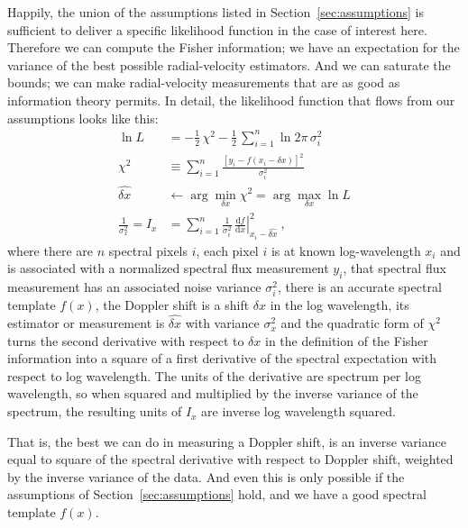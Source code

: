 \documentclass[modern]{aastex631}
\newcommand{\dd}{\mathrm{d}}
\newcommand{\sectionname}{Section}
\newcommand{\secref}[1]{\sectionname~\ref{#1}}
\begin{document}
Happily, the union of the assumptions listed in \secref{sec:assumptions} is sufficient to deliver a specific likelihood function in the case of interest here.
Therefore we can compute the Fisher information; we have an expectation for the variance of the best possible radial-velocity estimators.
And we can saturate the bounds; we can make radial-velocity measurements that are as good as information theory permits.
In detail, the likelihood function that flows from our assumptions looks like this:
\begin{align}
    \ln L &= -\frac{1}{2}\,\chi^2 - \frac{1}{2}\,\sum_{i=1}^n \ln 2\pi\,\sigma_i^2\label{eq:lnL}\\
    \chi^2 &\equiv \sum_{i=1}^n \frac{[y_i - f(x_i - \delta x)]^2}{\sigma_i^2}\label{eq:chi2}\\
    \widehat{\delta x} &\leftarrow \arg\min_{\delta x} \chi^2 = \arg\max_{\delta x} \ln L\label{eq:argmin}\\
    \frac{1}{\sigma_x^2} = I_x &= \sum_{i=1}^n\frac{1}{\sigma_i^2}\,\left.\frac{\dd f}{\dd x}\right|_{x_i-\widehat{\delta x}}^2\label{eq:ivar}~,
\end{align}
where there are $n$ spectral pixels $i$,
each pixel $i$ is at known log-wavelength $x_i$ and is associated with a normalized spectral flux measurement $y_i$,
that spectral flux measurement has an associated noise variance $\sigma_i^2$,
there is an accurate spectral template $f(x)$,
the Doppler shift is a shift $\delta x$ in the log wavelength,
its estimator or measurement is $\widehat{\delta x}$ with variance $\sigma_x^2$
and
the quadratic form of $\chi^2$ turns the second derivative with respect to $\delta x$ in the definition of the Fisher information into a square of a first derivative of the spectral expectation with respect to log wavelength.
The units of the derivative are spectrum per log wavelength, so when squared and multiplied by the inverse variance of the spectrum, the resulting units of $I_x$ are inverse log wavelength squared.

That is, the best we can do in measuring a Doppler shift, is an inverse variance equal to square of the spectral derivative with respect to Doppler shift, weighted by the inverse variance of the data.
And even this is only possible if the assumptions of \secref{sec:assumptions} hold, and we have a good spectral template $f(x)$.
\end{document}
